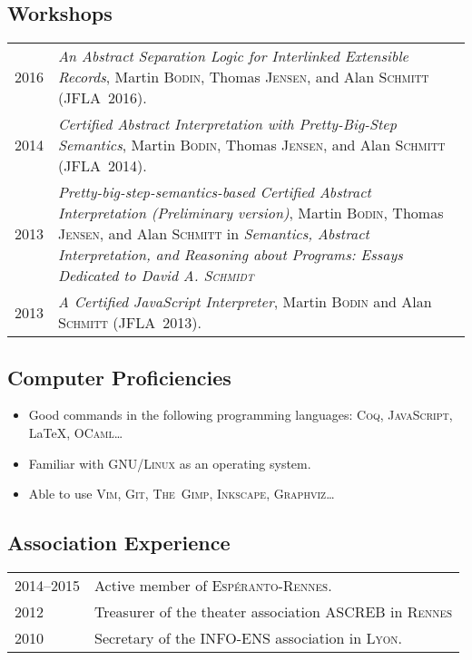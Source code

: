 \documentclass[12pt,a4paper]{article}
\makeatletter
\newenvironment{datecvsection}[1]%
               {\subsection*{#1}%
                 \noindent \begin{tabular}{@{}p{\annee}p{\texte}@{}}}
               {\end{tabular}}
\newenvironment{itemcvsection}[1]%
               {\subsection*{#1}\begin{itemize}}
               {\end{itemize}}
\makeatother
\begin{document}
\begin{datecvsection}{Workshops}

  2016 & \textit{An Abstract Separation Logic for Interlinked Extensible Records}, Martin \textsc{Bodin}, Thomas \textsc{Jensen}, and Alan \textsc{Schmitt} (JFLA~2016). \\

  2014 & \textit{Certified Abstract Interpretation with Pretty-Big-Step Semantics}, Martin \textsc{Bodin}, Thomas \textsc{Jensen}, and Alan \textsc{Schmitt} (JFLA~2014). \\

  2013 & \textit{Pretty-big-step-semantics-based Certified Abstract Interpretation (Preliminary version)}, Martin \textsc{Bodin}, Thomas \textsc{Jensen}, and Alan \textsc{Schmitt} in \textit{Semantics, Abstract Interpretation, and Reasoning about Programs: Essays Dedicated to David A. \textsc{Schmidt}} \\ %

  2013 & \textit{A Certified JavaScript Interpreter}, Martin \textsc{Bodin} and Alan \textsc{Schmitt} (JFLA~2013). \\

\end{datecvsection}

\begin{itemcvsection}{Computer Proficiencies}

	\item Good commands in the following programming languages:  \textsc{Coq}, \textsc{JavaScript}, \LaTeX, \textsc{OCaml}\ldots
	\item Familiar with \textsc{GNU/Linux} as an operating system.
	\item Able to use \textsc{Vim}, \textsc{Git}, \textsc{The~Gimp}, \textsc{Inkscape}, \textsc{Graphviz}\ldots

\end{itemcvsection}

\begin{datecvsection}{Association Experience}

    2014–2015 & Active member of \textsc{Espéranto-Rennes}. \\
	2012 & Treasurer of the theater association \textsc{ASCREB} in \textsc{Rennes} \\
	2010 & Secretary of the \textsc{INFO-ENS} association in \textsc{Lyon}. \\

\end{datecvsection}
\end{document}
